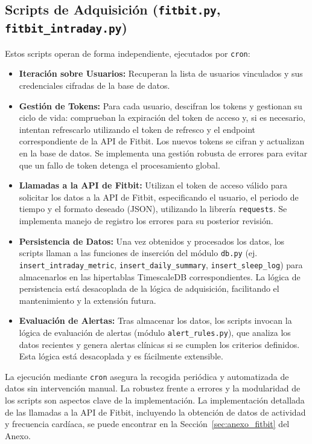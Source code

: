 \subsection{Scripts de Adquisición (\texttt{fitbit.py}, \texttt{fitbit\_intraday.py})}
Estos scripts operan de forma independiente, ejecutados por \texttt{cron}:
\begin{itemize}
    \item \textbf{Iteración sobre Usuarios:} Recuperan la lista de usuarios vinculados y sus credenciales cifradas de la base de datos. 
    \item \textbf{Gestión de Tokens:} Para cada usuario, descifran los tokens y gestionan su ciclo de vida: comprueban la expiración del token de acceso y, si es necesario, intentan refrescarlo utilizando el token de refresco y el endpoint correspondiente de la API de Fitbit. Los nuevos tokens se cifran y actualizan en la base de datos. Se implementa una gestión robusta de errores para evitar que un fallo de token detenga el procesamiento global.
    \item \textbf{Llamadas a la API de Fitbit:} Utilizan el token de acceso válido para solicitar los datos a la API de Fitbit, especificando el usuario, el periodo de tiempo y el formato deseado (JSON), utilizando la librería \texttt{requests}. Se implementa manejo de registro los errores para su posterior revisión.
    \item \textbf{Persistencia de Datos:} Una vez obtenidos y procesados los datos, los scripts llaman a las funciones de inserción del módulo \texttt{db.py} (ej. \texttt{insert\_intraday\_metric}, \texttt{insert\_daily\_summary}, \texttt{insert\_sleep\_log}) para almacenarlos en las hipertablas TimescaleDB correspondientes. La lógica de persistencia está desacoplada de la lógica de adquisición, facilitando el mantenimiento y la extensión futura.
    \item \textbf{Evaluación de Alertas:} Tras almacenar los datos, los scripts invocan la lógica de evaluación de alertas (módulo \texttt{alert\_rules.py}), que analiza los datos recientes y genera alertas clínicas si se cumplen los criterios definidos. Esta lógica está desacoplada y es fácilmente extensible.
\end{itemize}
La ejecución mediante \texttt{cron} asegura la recogida periódica y automatizada de datos sin intervención manual. La robustez frente a errores y la modularidad de los scripts son aspectos clave de la implementación. La implementación detallada de las llamadas a la API de Fitbit, incluyendo la obtención de datos de actividad y frecuencia cardíaca, se puede encontrar en la Sección~\ref{sec:anexo_fitbit} del Anexo.


